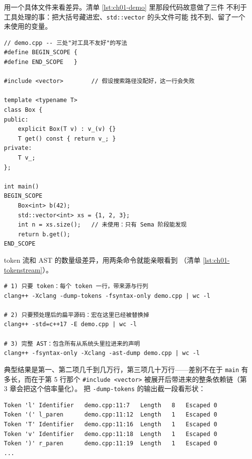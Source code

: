 \documentclass[12pt,a4paper,fontset=fandol]{ctexbook}
\begin{document}
用一个具体文件来看差异。清单 \ref{lst:ch01-demo} 里那段代码故意做了三件
不利于工具处理的事：把大括号藏进宏、\texttt{std::vector} 的头文件可能
找不到、留了一个未使用的变量。

\begin{lstlisting}[style=cppstyle,caption={带宏与不完整包含的示例文件 \texttt{demo.cpp}},label={lst:ch01-demo}]
// demo.cpp -- 三处"对工具不友好"的写法
#define BEGIN_SCOPE {
#define END_SCOPE   }

#include <vector>        // 假设搜索路径没配好，这一行会失败

template <typename T>
class Box {
public:
    explicit Box(T v) : v_(v) {}
    T get() const { return v_; }
private:
    T v_;
};

int main()
BEGIN_SCOPE
    Box<int> b(42);
    std::vector<int> xs = {1, 2, 3};
    int n = xs.size();   // 未使用：只有 Sema 阶段能发现
    return b.get();
END_SCOPE
\end{lstlisting}

token 流和 AST 的数量级差异，用两条命令就能亲眼看到
（清单 \ref{lst:ch01-tokenstream}）。

\begin{lstlisting}[style=shellstyle,caption={分别取出 token 流、预处理结果与 AST},label={lst:ch01-tokenstream}]
# 1) 只要 token：每个 token 一行，带来源与行列
clang++ -Xclang -dump-tokens -fsyntax-only demo.cpp | wc -l

# 2) 只要预处理后的扁平源码：宏在这里已经被替换掉
clang++ -std=c++17 -E demo.cpp | wc -l

# 3) 完整 AST：包含所有从系统头里拉进来的声明
clang++ -fsyntax-only -Xclang -ast-dump demo.cpp | wc -l
\end{lstlisting}

典型结果是第一、第二项几千到几万行，第三项几十万行——差别不在于
\texttt{main} 有多长，而在于第 5 行那个 \texttt{\#include <vector>}
被展开后带进来的整条依赖链（第 3 章会把这个倍率量化）。
把 \texttt{-dump-tokens} 的输出截一段看形状：

\begin{lstlisting}[style=shellstyle,caption={\texttt{-dump-tokens} 输出的形状（截断）},label={lst:ch01-tokenout}]
Token 'l' Identifier   demo.cpp:11:7   Length   8   Escaped 0
Token '(' l_paren      demo.cpp:11:12  Length   1   Escaped 0
Token 'T' Identifier   demo.cpp:11:16  Length   1   Escaped 0
Token 'v' Identifier   demo.cpp:11:18  Length   1   Escaped 0
Token ')' r_paren      demo.cpp:11:19  Length   1   Escaped 0
...
\end{lstlisting}
\end{document}
